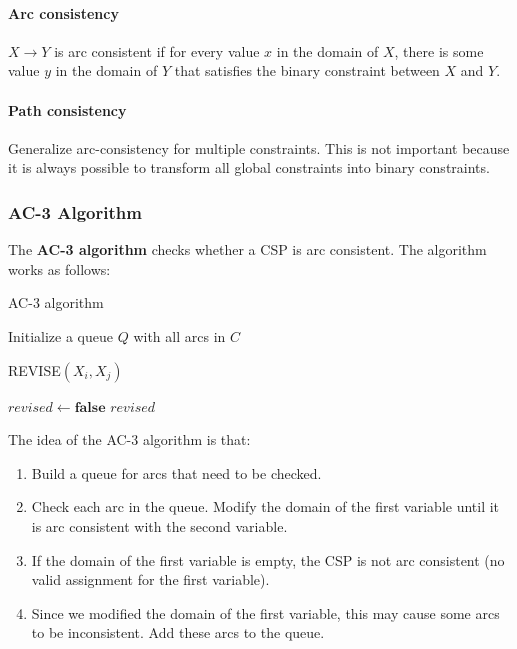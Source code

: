 \documentclass[a4paper,12pt]{article}
\begin{document}
\paragraph{Arc consistency} $X \to Y$ is arc consistent if for every value $x$ in the domain of $X$, there is some value $y$ in the domain of $Y$ that satisfies the binary constraint between $X$ and $Y$.

\paragraph{Path consistency} Generalize arc-consistency for multiple constraints. This is not important because it is always possible to transform all global constraints into binary constraints.

\subsubsection{AC-3 Algorithm}

The \textbf{AC-3 algorithm} checks whether a CSP is arc consistent. The algorithm works as follows:

\begin{algorithm}[H]
  \caption{AC-3 algorithm}
  Initialize a queue $Q$ with all arcs in $C$\;
\end{algorithm}

\begin{algorithm}[H]
  \caption{REVISE$(X_i, X_j)$}
  $revised \gets \textbf{false}$\;
  \Return $revised$\;
\end{algorithm}

The idea of the AC-3 algorithm is that:
\begin{enumerate}
  \item Build a queue for arcs that need to be checked.
  \item Check each arc in the queue. Modify the domain of the first variable until it is arc consistent with the second variable.
  \item If the domain of the first variable is empty, the CSP is not arc consistent (no valid assignment for the first variable).
  \item Since we modified the domain of the first variable, this may cause some arcs to be inconsistent. Add these arcs to the queue.
\end{enumerate}
\end{document}
